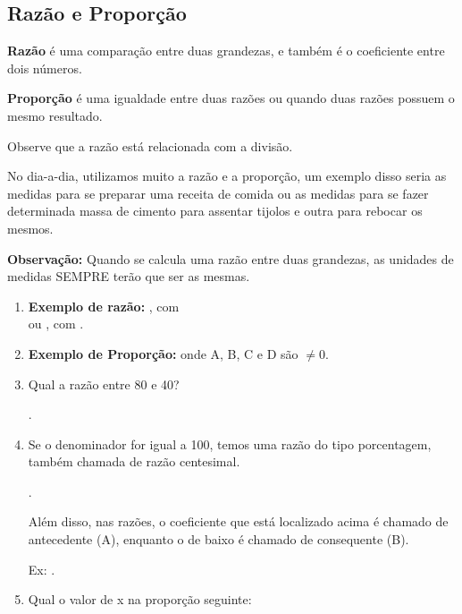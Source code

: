 \begin{multicols*}{2}
	\section{Razão e Proporção}

	\textbf{Razão} é uma comparação entre duas grandezas, e também é o coeficiente entre dois números.

	\textbf{Proporção} é uma igualdade entre duas razões ou quando duas razões possuem o mesmo resultado.

	Observe que a razão está relacionada com a divisão.

	No dia-a-dia, utilizamos muito a razão e a proporção, um exemplo disso seria as medidas para se preparar uma receita de comida ou as medidas para se fazer determinada massa de cimento para assentar tijolos e outra para rebocar os mesmos.

	\textbf{Observação:} Quando se calcula uma razão entre duas grandezas, as unidades de medidas SEMPRE terão que ser as mesmas.

	\begin{enumerate}

		\item \textbf{Exemplo de razão:}  , com\\

		      	 ou , com .

		\item \textbf{Exemplo de Proporção:} 	onde A, B, C e D são $\neq 0$.

		\item Qual a razão entre 80 e 40?

		      .

		\item Se o denominador for igual a 100, temos uma razão do tipo porcentagem, também chamada de razão centesimal.

		      .

		      Além disso, nas razões, o coeficiente que está localizado acima é chamado de antecedente (A), enquanto o de baixo é chamado de consequente (B).

		      Ex: .

		\item Qual o valor de x na proporção seguinte:


\end{enumerate}
\end{multicols*}
